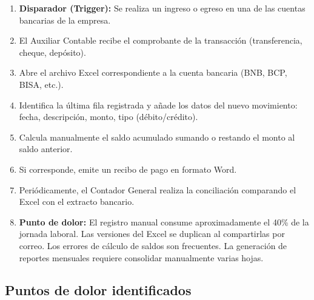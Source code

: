 \documentclass[stu]{apa7}
\begin{document}
\begin{enumerate}
    \item \textbf{Disparador (Trigger):} Se realiza un ingreso o egreso en una de las cuentas bancarias de la empresa.

    \item El Auxiliar Contable recibe el comprobante de la transacción (transferencia, cheque, depósito).

    \item Abre el archivo Excel correspondiente a la cuenta bancaria (BNB, BCP, BISA, etc.).

    \item Identifica la última fila registrada y añade los datos del nuevo movimiento: fecha, descripción, monto, tipo (débito/crédito).

    \item Calcula manualmente el saldo acumulado sumando o restando el monto al saldo anterior.

    \item Si corresponde, emite un recibo de pago en formato Word.

    \item Periódicamente, el Contador General realiza la conciliación comparando el Excel con el extracto bancario.

    \item \textbf{Punto de dolor:} El registro manual consume aproximadamente el 40\% de la jornada laboral. Las versiones del Excel se duplican al compartirlas por correo. Los errores de cálculo de saldos son frecuentes. La generación de reportes mensuales requiere consolidar manualmente varias hojas.
\end{enumerate}

\subsection{Puntos de dolor identificados}
\end{document}
